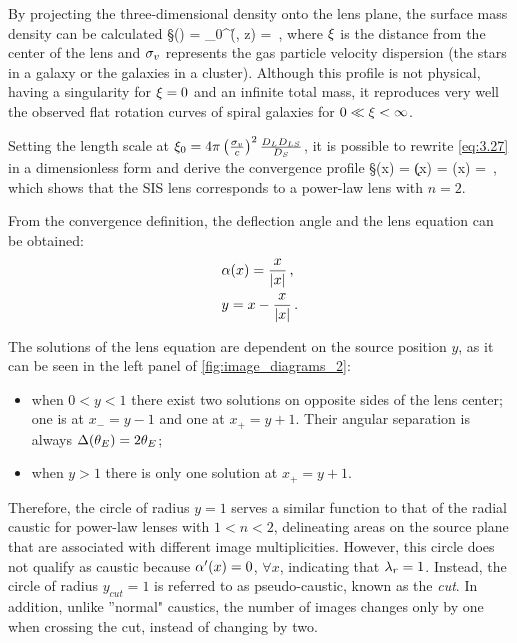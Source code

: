 By projecting the three-dimensional density onto the lens plane, the surface mass density can be calculated
\be
\label{eq:3.27}
\S (\x) = \int_0^\infty \r (\x, z)  =  \,,
\ee
where $\xi$ is the distance from the center of the lens and $\sigma_v$ represents the gas particle velocity dispersion (\ie the stars in a galaxy or the galaxies in a cluster).
Although this profile is not physical, having a singularity for $\xi = 0$ and an infinite total mass, it reproduces very well the observed flat rotation curves of spiral galaxies for $0 \ll \xi < \infty$.

Setting the length scale at $\xi_0 = 4 \pi \left( \frac{\sigma_v}{c} \right)^2 \frac{D_L D_{LS}}{D_S}$, it is possible to rewrite \cref{eq:3.27} in a dimensionless form and derive the convergence profile
\be
\label{eq:3.28}
\S (x) =  \quad \Rightarrow \quad \k (x) = \g (x) =  \,,
\ee
which shows that the SIS lens corresponds to a power-law lens with $n=2$.

From the convergence definition, the deflection angle and the lens equation can be obtained:
\begin{subequations}
\begin{align}
    \label{eq:3.29a}
    &\alpha (x) = \frac{x}{|x|} \,,
    \\
    \label{eq:3.29b}
    &y = x - \frac{x}{|x|} \,.
\end{align}
\end{subequations}

The solutions of the lens equation are dependent on the source position $y$, as it can be seen in the left panel of \cref{fig:image_diagrams_2}:
\begin{itemize}
    \item when $0 < y < 1$ there exist two solutions on opposite sides of the lens center; one is at $x_- = y - 1$ and one at $x_+ = y + 1$. Their angular separation is always $\Delta (\theta_E) = 2 \theta_E$;

    \item when $y > 1$ there is only one solution at $x_+ = y + 1$.
\end{itemize}

Therefore, the circle of radius $y = 1$ serves a similar function to that of the radial caustic for power-law lenses with $1 < n < 2$, delineating areas on the source plane that are associated with different image multiplicities. However, this circle does not qualify as caustic because $\alpha^\prime (x) = 0$, $\forall x$, indicating that $\lambda_r = 1$. Instead, the circle of radius $y_{cut} = 1$ is referred to as pseudo-caustic, known as the \emph{cut}. In addition, unlike ''normal" caustics, the number of images changes only by one when crossing the cut, instead of changing by two.


